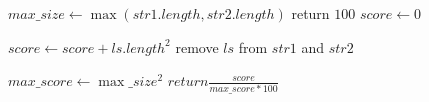 \begin{algorithmic}

\State $max\_size \gets \max(str1.length, str2.length)$
	\State return $100$
\EndIf
\State $score \gets 0$

	\State $score \gets score + ls.length^2 $
	\State remove $ls$ from $str1$ and $str2$
\EndWhile

\State $max\_score \gets \max\_size^2$
\State $return \frac{score}{max\_score * 100} $

\EndFunction
\end{algorithmic}
